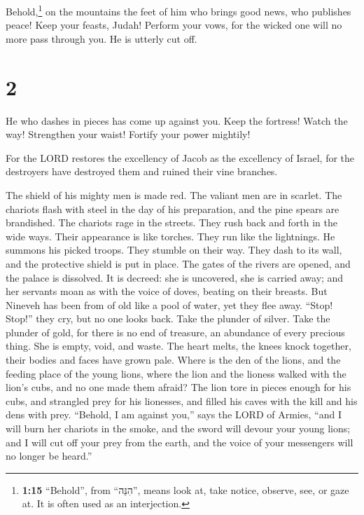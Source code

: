  Behold,\footnote{\textbf{1:15} ``Behold'', from
  ``הִנֵּה'', means look at, take notice, observe, see, or gaze at. It
  is often used as an interjection.} on the mountains the feet of him
who brings good news, who publishes peace! Keep your feasts, Judah!
Perform your vows, for the wicked one will no more pass through you. He
is utterly cut off.

\hypertarget{section-1}{%
\section{2}\label{section-1}}

 He who dashes in pieces has come up against you. Keep the
fortress! Watch the way! Strengthen your waist! Fortify your power
mightily!

 For the LORD restores the excellency of Jacob as the
excellency of Israel, for the destroyers have destroyed them and ruined
their vine branches.

 The shield of his mighty men is made red. The valiant men
are in scarlet. The chariots flash with steel in the day of his
preparation, and the pine spears are brandished.  The
chariots rage in the streets. They rush back and forth in the wide ways.
Their appearance is like torches. They run like the lightnings.
 He summons his picked troops. They stumble on their way.
They dash to its wall, and the protective shield is put in place.
 The gates of the rivers are opened, and the palace is
dissolved.  It is decreed: she is uncovered, she is
carried away; and her servants moan as with the voice of doves, beating
on their breasts.  But Nineveh has been from of old like a
pool of water, yet they flee away. ``Stop! Stop!'' they cry, but no one
looks back.  Take the plunder of silver. Take the plunder
of gold, for there is no end of treasure, an abundance of every precious
thing.  She is empty, void, and waste. The heart melts,
the knees knock together, their bodies and faces have grown pale.
 Where is the den of the lions, and the feeding place of
the young lions, where the lion and the lioness walked with the lion's
cubs, and no one made them afraid?  The lion tore in
pieces enough for his cubs, and strangled prey for his lionesses, and
filled his caves with the kill and his dens with prey. 
``Behold, I am against you,'' says the LORD of Armies, ``and I will burn
her chariots in the smoke, and the sword will devour your young lions;
and I will cut off your prey from the earth, and the voice of your
messengers will no longer be heard.''

